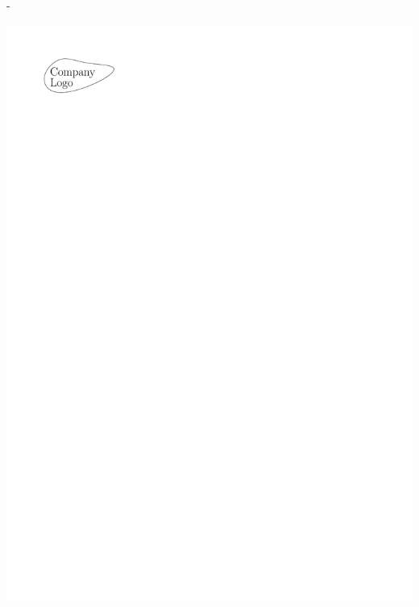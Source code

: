 \begin{titlingpage}
\begin{adjustwidth}{\unitlength}{-\unitlength}
\begin{raggedright}
{\begin{textblock}{3}
					\includegraphics[width=\textwidth]{gfx/CompanyLogo}
				\end{textblock}
			}{} %
		\end{raggedright}
	\end{adjustwidth}

	\cleardoublepage


\end{titlingpage}
